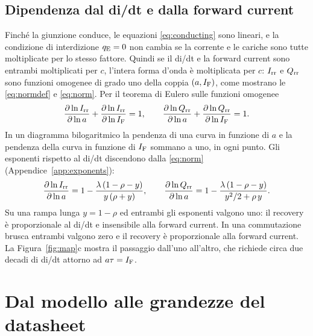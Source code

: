 \documentclass[10pt,a4paper]{scrartcl}
\let\newcommand\pdvaluedefine
\newcommand{\IF}{I_\mathrm{F}}
\newcommand{\Irr}{I_\mathrm{rr}}
\newcommand{\Qrr}{Q_\mathrm{rr}}
\newcommand{\qE}{q_\mathrm{E}}
\begin{document}
\subsection{Dipendenza dal di/dt e dalla forward current}
\label{sec:exponents}
Finché la giunzione conduce, le equazioni \eqref{eq:conducting} sono lineari, e la condizione di interdizione $\qE = 0$ non cambia se la corrente e le cariche sono tutte moltiplicate per lo stesso fattore. Quindi se il di/dt e la forward current sono entrambi moltiplicati per $c$, l'intera forma d'onda è moltiplicata per $c$: $\Irr$ e $\Qrr$ sono funzioni omogenee di grado uno della coppia $(a, \IF)$, come mostrano le \eqref{eq:normdef} e \eqref{eq:norm}. Per il teorema di Eulero sulle funzioni omogenee
\begin{equation}
\frac{\partial \ln \Irr}{\partial \ln a} + \frac{\partial \ln \Irr}{\partial \ln \IF} = 1 , \qquad
\frac{\partial \ln \Qrr}{\partial \ln a} + \frac{\partial \ln \Qrr}{\partial \ln \IF} = 1 .
\label{eq:euler}
\end{equation}
In un diagramma bilogaritmico la pendenza di una curva in funzione di $a$ e la pendenza della curva in funzione di $\IF$ sommano a uno, in ogni punto. Gli esponenti rispetto al di/dt discendono dalla \eqref{eq:norm} (Appendice~\ref{app:exponents}):
\begin{equation}
\frac{\partial \ln \Irr}{\partial \ln a} = 1 - \frac{\lambda\,(1-\rho-y)}{y\,(\rho+y)} , \qquad
\frac{\partial \ln \Qrr}{\partial \ln a} = 1 - \frac{\lambda\,(1-\rho-y)}{y^2/2+\rho\,y} .
\label{eq:exponents}
\end{equation}
Su una rampa lunga $y = 1-\rho$ ed entrambi gli esponenti valgono uno: il recovery è proporzionale al di/dt e insensibile alla forward current. In una commutazione brusca entrambi valgono zero e il recovery è proporzionale alla forward current. La Figura~\ref{fig:map}c mostra il passaggio dall'uno all'altro, che richiede circa due decadi di di/dt attorno ad $a\tau = \IF$.

\section{Dal modello alle grandezze del datasheet}
\label{sec:direct}
\end{document}
